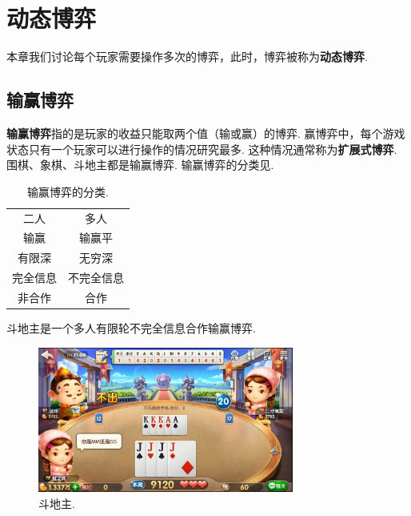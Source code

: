 \chapter{动态博弈}\label{chap:dynamical-game}

本章我们讨论每个玩家需要操作多次的博弈，此时，博弈被称为\textbf{动态博弈}.

\section{输赢博弈}

\textbf{输赢博弈}指的是玩家的收益只能取两个值（输或赢）的博弈. 赢博弈中，每个游戏状态只有一个玩家可以进行操作的情况研究最多. 这种情况通常称为\textbf{扩展式博弈}. 围棋、象棋、斗地主都是输赢博弈. 输赢博弈的分类见.

\begin{table}[ht]
    \centering
    \begin{tabular}{cc}
        二人 & 多人 \\
        输赢 & 输赢平\\
        有限深 & 无穷深 \\
        完全信息 & 不完全信息 \\
        非合作 & 合作
    \end{tabular}
    \caption{输赢博弈的分类.}
    \label{tab:win-lose-game}
\end{table}

\begin{example}
    斗地主是一个多人有限轮不完全信息合作输赢博弈.
\begin{figure}
    \centering
    \includegraphics[width=0.75\textwidth]{Figures/dynamical-game/fight-landlord.jpg}
    \caption{斗地主.}
\end{figure}

\end{example}

